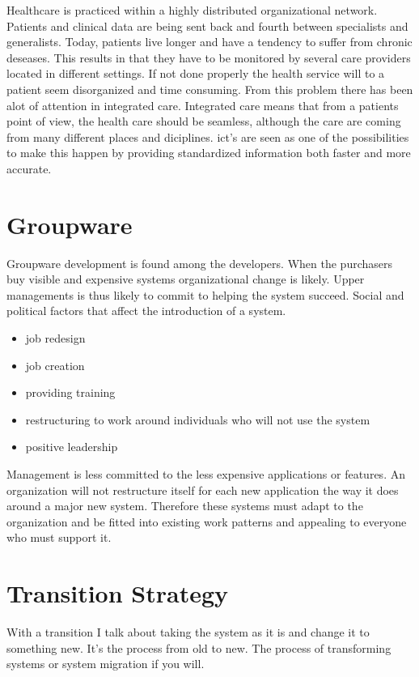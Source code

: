 Healthcare is practiced within a highly distributed organizational network.
Patients and clinical data are being sent back and fourth between specialists and generalists.
Today, patients live longer and have a tendency to suffer from chronic deseases. 
This results in that they have to be monitored by several care providers located in different settings.
If not done properly the health service will to a patient seem disorganized and time consuming.
From this problem there has been alot of attention in integrated care. 
Integrated care means that from a patients point of view, the health care should be seamless, although the care are coming from many different places and diciplines. 
\gls{ict}'s are seen as one of the possibilities to make this happen by providing standardized information both faster and more accurate.




\cite{ictcare:winther}
\cite{ehealth:blaya}

\section{Groupware}
Groupware development is found among the developers.
When the purchasers buy visible and expensive systems organizational change is likely.
Upper managements is thus likely to commit to helping the system succeed.
Social and political factors that affect the introduction of a system.

\begin{itemize}
\item job redesign 
\item job creation
\item providing training
\item restructuring to work around individuals who will not use the system
\item positive leadership
\end{itemize}

Management is less committed to the less expensive applications or features.
An organization will not restructure itself for each new application the way it does around a major new system. Therefore these systems must adapt to the organization and be fitted into existing work patterns and appealing to everyone who must support it. 

\section{Transition Strategy}
With a transition I talk about taking the system as it is and change it to something new. 
It's the process from old to new. The process of transforming systems or system migration if you will.

